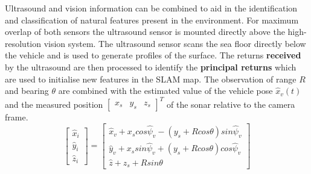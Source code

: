 Ultrasound and vision information can be combined to aid in the identification and classification of natural features present in the environment.
For maximum overlap of both sensors the ultrasound sensor is mounted directly above the high-resolution vision system.
The ultrasound sensor scans the sea floor directly below the vehicle and is used to generate
profiles of the surface.
The returns \textbf{received} by the ultrasound are then processed to identify the \textbf{principal returns} which are used to initialise new features in the SLAM map.
The observation of range $R$ and bearing $\theta$ are combined with the estimated value of the vehicle pose $\hat{x}_v(t)$ and the measured position
$\left[ \begin{array}{ccc} \textit{x}_s & \textit{y}_s & \textit{z}_s \end{array}\right]^T$ of the sonar relative to the camera frame.
\begin{equation}
\left[ {
\begin{array}{c} \hat{\textit{x}}_i \\ \hat{\textit{y}}_i \\ \hat{\textit{z}}_i \end{array}
} \right] =
\left[ {
\begin{array}{c}
	\hat{\textit{x}}_v + \textit{x}_s cos \hat{\psi}_v - (\textit{y}_s + R cos \theta) sin \hat{\psi}_v \\
	\hat{\textit{y}}_v + \textit{x}_s sin \hat{\psi}_v + (\textit{y}_s + R cos \theta) cos \hat{\psi}_v \\
	\hat{\textit{z}} + \textit{z}_s + R sin \theta
\end{array}
} \right]
\end{equation}

